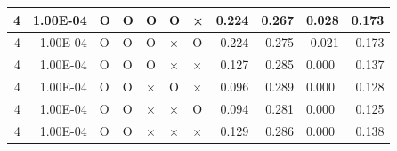 \documentclass[11pt]{article}
\begin{document}
\begin{longtable}[h]{|r|r|l|l|l|l|l|r|r|l|r|}
4                                 & 1.00E-04                         & O                                & O                                & O                                & O                                & ×                                 & 0.224                             & 0.267                             & \multicolumn{1}{r|}{0.028}         & 0.173                               \\ \hline
4                                 & 1.00E-04                         & O                                & O                                & O                                & ×                                & O                                 & 0.224                             & 0.275                             & \multicolumn{1}{r|}{0.021}         & 0.173                               \\ \hline
4                                 & 1.00E-04                         & O                                & O                                & O                                & ×                                & ×                                 & 0.127                             & 0.285                             & 0.000                              & 0.137                               \\ \hline
4                                 & 1.00E-04                         & O                                & O                                & ×                                & O                                & ×                                 & 0.096                             & 0.289                             & 0.000                              & 0.128                               \\ \hline
4                                 & 1.00E-04                         & O                                & O                                & ×                                & ×                                & O                                 & 0.094                             & 0.281                             & 0.000                              & 0.125                               \\ \hline
4                                 & 1.00E-04                         & O                                & O                                & ×                                & ×                                & ×                                 & 0.129                             & 0.286                             & 0.000                              & 0.138                               \\ \hline

\end{longtable}
\end{document}
